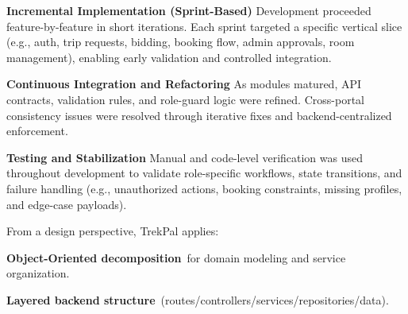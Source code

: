 \documentclass[12pt,a4paper]{article}
\newlength{\ThesisParagraphIndent}
\newcommand{\ThesisParagraph}[1]{%
  \par\begingroup
  \setlength{\leftskip}{\ThesisParagraphIndent}%
  \setlength{\parindent}{0pt}%
  \noindent#1\par
  \endgroup}
\begin{document}
\begin{list}{}{\setlength{\leftmargin}{\dimexpr\ThesisParagraphIndent+1.5em\relax}\setlength{\labelsep}{0.5em}\setlength{\topsep}{2pt}\setlength{\parsep}{0pt}}
\item[3.] \textbf{Incremental Implementation (Sprint-Based)}\newline{} Development proceeded feature-by-feature in short iterations. Each sprint targeted a specific vertical slice (e.g., auth, trip requests, bidding, booking flow, admin approvals, room management), enabling early validation and controlled integration.
\end{list}


\begin{list}{}{\setlength{\leftmargin}{\dimexpr\ThesisParagraphIndent+1.5em\relax}\setlength{\labelsep}{0.5em}\setlength{\topsep}{2pt}\setlength{\parsep}{0pt}}
\item[4.] \textbf{Continuous Integration and Refactoring}\newline{} As modules matured, API contracts, validation rules, and role-guard logic were refined. Cross-portal consistency issues were resolved through iterative fixes and backend-centralized enforcement.
\end{list}


\begin{list}{}{\setlength{\leftmargin}{\dimexpr\ThesisParagraphIndent+1.5em\relax}\setlength{\labelsep}{0.5em}\setlength{\topsep}{2pt}\setlength{\parsep}{0pt}}
\item[5.] \textbf{Testing and Stabilization}\newline{} Manual and code-level verification was used throughout development to validate role-specific workflows, state transitions, and failure handling (e.g., unauthorized actions, booking constraints, missing profiles, and edge-case payloads).
\end{list}


\ThesisParagraph{From a design perspective, TrekPal applies:}


\begin{list}{}{\setlength{\leftmargin}{\dimexpr\ThesisParagraphIndent+1.5em\relax}\setlength{\labelsep}{0.5em}\setlength{\topsep}{2pt}\setlength{\parsep}{0pt}}
\item[\textbullet] \textbf{Object-Oriented decomposition}~for domain modeling and service organization.
\end{list}


\begin{list}{}{\setlength{\leftmargin}{\dimexpr\ThesisParagraphIndent+1.5em\relax}\setlength{\labelsep}{0.5em}\setlength{\topsep}{2pt}\setlength{\parsep}{0pt}}
\item[\textbullet] \textbf{Layered backend structure}~(routes/controllers/services/repositories/data).
\end{list}
\end{document}
